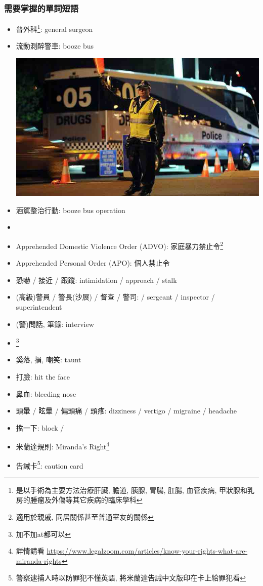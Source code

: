 \subsubsection*{需要掌握的單詞短語}
\begin{itemize}
  \itemsep0em
  \item 普外科\footnote{是以手術為主要方法治療肝臟, 膽道, 胰腺, 胃腸, 肛腸, 血管疾病, 甲狀腺和乳房的腫瘤及外傷等其它疾病的臨床學科}: general surgeon
  \item 流動測醉警車: booze bus
  \begin{center}
      \includegraphics[scale=.5]{pics/booze-bus}
  \end{center}
  \item 酒駕整治行動: booze bus operation
  \item {}
  \item Apprehended Domestic Violence Order (ADVO): 家庭暴力禁止令\footnote{適用於親戚, 同居關係甚至普通室友的關係}
  \item Apprehended Personal Order (APO): 個人禁止令
  \item 恐嚇 / 接近 / 跟蹤: intimidation / approach / stalk
  \item (高級)警員 / 警長(沙展) / 督查 / 警司:  / sergeant / inspector / superintendent
  \item (警)問話, 筆錄: interview
  \item {}\footnote{加不加at都可以}
  \item 奚落, 損, 嘲笑: taunt
  \item 打臉: hit  the face
  \item 鼻血: bleeding nose
  \item 頭暈 / 眩暈 / 偏頭痛 / 頭疼: dizziness / vertigo / migraine / headache
  \item 擋一下: block / 
  \item 米蘭達規則: Miranda's Right\footnote{詳情請看 \url{https://www.legalzoom.com/articles/know-your-rights-what-are-miranda-rights}}
  \item 告誡卡\footnote{警察逮捕人時以防罪犯不懂英語, 將米蘭達告誡中文版印在卡上給罪犯看}: caution card
\end{itemize}

